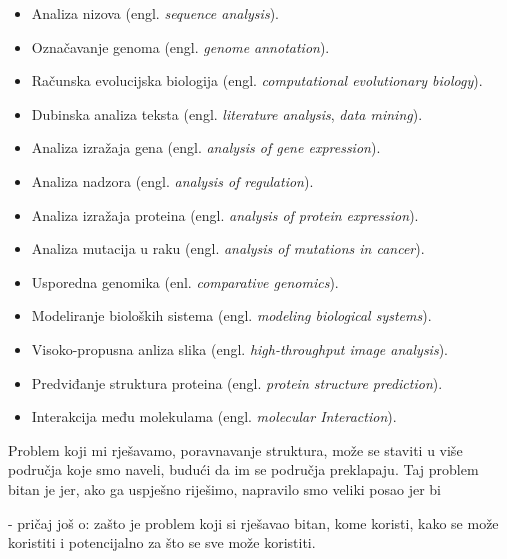 \documentclass[times, utf8, zavrsni]{fer}
\begin{document}
\begin{itemize}
\item
Analiza nizova (engl. \textit{sequence analysis}). 

\item
Označavanje genoma (engl. \textit{genome annotation}).

\item
Računska evolucijska biologija (engl. \textit{computational
evolutionary biology}).

\item
Dubinska analiza teksta (engl. \textit{literature analysis}, 
\textit{data mining}).

\item
Analiza izražaja gena (engl. \textit{analysis of gene expression}).

\item
Analiza nadzora (engl. \textit{analysis of regulation}).

\item
Analiza izražaja proteina (engl. \textit{analysis of protein
expression}).

\item
Analiza mutacija u raku (engl. \textit{analysis of mutations in cancer}).

\item
Usporedna genomika (enl. \textit{comparative genomics}).

\item
Modeliranje bioloških sistema (engl. \textit{modeling biological
systems}).

\item
Visoko-propusna anliza slika (engl. \textit{high-throughput
image analysis}).

\item
Predviđanje struktura proteina (engl. \textit{protein structure prediction}).

\item 
Interakcija među molekulama (engl. \textit{molecular Interaction}).
\end{itemize}

Problem koji mi rješavamo, poravnavanje struktura, može se staviti u više 
područja koje smo naveli, budući da im se područja preklapaju. Taj problem
bitan je jer, ako ga uspješno riješimo, napravilo smo veliki posao jer
bi 




- pričaj još o: zašto je problem koji si rješavao bitan,
kome koristi, kako se može koristiti i potencijalno za što se
sve može koristiti.
\end{document}
